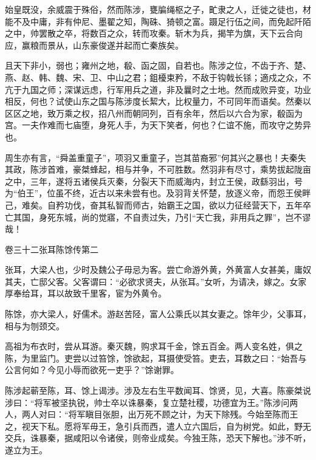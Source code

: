 \documentclass[12pt,UTF8]{ctexbook}
\begin{document}
始皇既没，余威震于殊俗，然而陈涉，甕牑绳枢之子，甿隶之人，迁徙之徒也，材能不及中庸，非有仲尼、墨翟之知，陶硃、猗顿之富。蹑足行伍之间，而免起阡陌之中，帅罢散之卒，将数百之众，转而攻秦。斩木为兵，揭竿为旗，天下云合向应，赢粮而景从，山东豪俊遂并起而亡秦族矣。



且天下非小，弱也；雍州之地，殽、函之固，自若也。陈涉之位，不齿于齐、楚、燕、赵、韩、魏、宋、卫、中山之君；鉏櫌束矜，不敌于钩戟长铩；適戍之众，不亢于九国之师；深谋远虑，行军用兵之道，非及曩时之士地。然而成败异变，功业相反，何也？试使山东之国与陈涉度长絜大，比权量力，不可同年而语矣。然秦以区区之地，致万乘之权，招八州而朝同列，百有余年，然后以六合为家，殽函为宫。一夫作难而七庙堕，身死人手，为天下笑者，何也？仁谊不施，而攻守之势异也。



周生亦有言，“舜盖重童子”，项羽又重童子，岂其苗裔邪”何其兴之暴也！夫秦失其政，陈涉首难，豪桀蜂起，相与并争，不可胜数。然羽非有尽寸，乘势拔起陇亩之中，三年，遂将五诸侯兵灭秦，分裂天下而威海内，封立王侯，政繇羽出，号为“伯王”，位虽不终，近古以来未尝有也。及羽背关怀楚，放逐义帝，而怨王侯畔己，难矣。自矜功伐，奋其私智而师古，始霸王之国，欲以力征经营天下，五年卒亡其国，身死东城，尚的觉寤，不自责过失，乃引“天亡我，非用兵之罪”，岂不谬哉！





卷三十二张耳陈馀传第二



张耳，大梁人也，少时及魏公子毋忌为客。尝亡命游外黄，外黄富人女甚美，庸奴其夫，亡邸父客。父客谓曰：“必欲求贤夫，从张耳。”女听，为请决，嫁之。女家厚奉给耳，耳以故致千里客，宦为外黄令。



陈馀，亦大梁人，好儒术。游赵苦陉，富人公乘氏以其女妻之。馀年少，父事耳，相与为刎颈交。



高祖为布衣时，尝从耳游。秦灭魏，购求耳千金，馀五百金。两人变名姓，俱之陈，为里监门。吏尝以过笞馀，馀欲起，耳摄使受笞。吏去，耳数之曰：“始吾与公言何如？今见小辱而欲死一吏乎？”馀谢罪。



陈涉起蕲至陈，耳、馀上谒涉。涉及左右生平数闻耳、馀贤，见，大喜。陈豪桀说涉曰：“将军被坚执锐，帅士卒以诛暴秦，复立楚社稷，功德宜为王。”陈涉问两人，两人对曰：“将军瞋目张胆，出万死不顾之计，为天下除残。今始至陈而王之，视天下私。愿将军毋王，急引兵而西，遣人立六国后，自为树党。如此，野无交兵，诛暴秦，据咸阳以令诸侯，则帝业成矣。今独王陈，恐天下解也。”涉不听，遂立为王。
\end{document}
